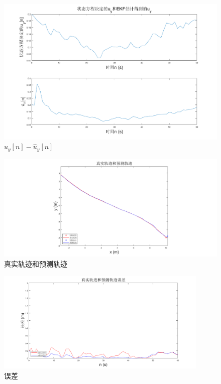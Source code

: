 \documentclass{article}
\begin{document}
\begin{figure}
    \centering
    \includegraphics[width = \textwidth]{imgs/7.png}
    \caption{$u_y[n]-\hat{u}_y[n]$}
    \label{fig:chart7}
\end{figure}

\begin{figure}
    \centering
    \includegraphics[width = \textwidth]{imgs/8.png}
    \caption{真实轨迹和预测轨迹}
    \label{fig:chart8}
\end{figure}

\begin{figure}
    \centering
    \includegraphics[width =0.9\textwidth]{imgs/9.png}
    \caption{误差}
    \label{fig:chart9}
\end{figure}
\end{document}
